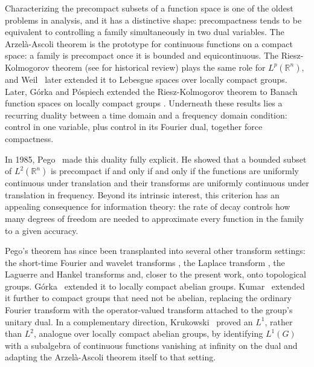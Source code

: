 \documentclass[11pt]{amsart}
\begin{document}
Characterizing the precompact subsets of a function space is one of the oldest problems in analysis, and it has a distinctive shape: precompactness tends to be equivalent to controlling a family simultaneously in two dual variables. The Arzel\`a-Ascoli theorem is the prototype for continuous functions on a compact space: a family is precompact once it is bounded and equicontinuous. The Riesz-Kolmogorov theorem (see \cite{Hanche-Olsen} for historical review) plays the same role for $L^p(\mathbb{R}^n)$, and Weil~\cite{Weil} later extended it to Lebesgue spaces over locally compact groups. Later, G\'orka and P\'ospiech extended  the Riesz-Kolmogorov theorem to Banach function spaces on locally compact groups \cite{Gorka2019}.  Underneath these results lies a recurring duality between a time domain and a frequency domain condition: control in one variable, plus control in its Fourier dual, together force compactness.

In 1985, Pego~\cite{Pego} made this duality fully explicit. He showed that a bounded subset of $L^2(\mathbb{R}^n)$ is precompact if and only if and only if the functions are uniformly continuous under translation and their transforms are uniformly continuous under translation in frequency. Beyond its intrinsic interest, this criterion has an appealing consequence for information theory: the rate of decay controls how many degrees of freedom are needed to approximate every function in the family to a given accuracy.

Pego's theorem has since been transplanted into several other transform settings: the short-time Fourier and wavelet transforms \cite{Dorfler2002}, the Laplace transform  \cite{Krukowski2020}, the Laguerre and Hankel transforms \cite{Horvath2022} and, closer to the present work, onto topological groups. G\'orka~\cite{Gorka2014, Gorka2016} extended it to locally compact abelian groups. Kumar~\cite{Kumar2024} extended it further  to compact groups that need not be abelian, replacing the ordinary Fourier transform with the operator-valued transform attached to the group's unitary dual. In a complementary direction, Krukowski~\cite{Krukowski} proved an $L^1$, rather than $L^2$, analogue over locally compact abelian groups, by identifying $L^1(G)$ with a subalgebra of continuous functions vanishing at infinity on the dual and adapting the Arzel\`a-Ascoli theorem itself to that setting.
\end{document}
